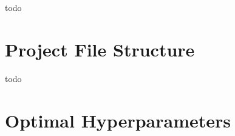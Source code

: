 \documentclass[letterpaper,12pt]{article}
\begin{document}
todo


\begin{appendices}

\clearpage




\clearpage
\section{Project File Structure}
\label{sec:appendix-project-file-structure}

todo


\clearpage
\section{Optimal Hyperparameters}
\label{sec:appendix-optimal-hyperparameters}

\begin{landscape}

\end{landscape}


\clearpage




\end{appendices}
\end{document}
